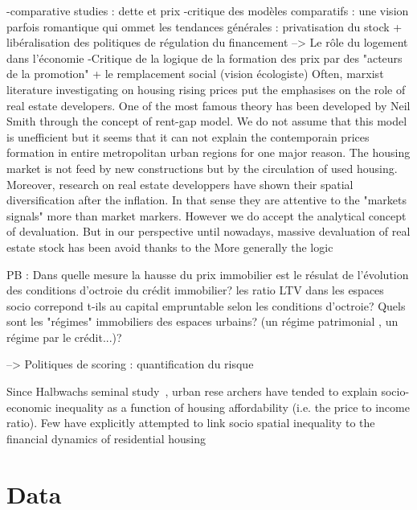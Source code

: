 -comparative studies : dette et prix
-critique des modèles comparatifs : une vision parfois romantique qui ommet les tendances générales : privatisation du stock + libéralisation des politiques de régulation du financement
--> Le rôle du logement dans l'économie
-Critique de la logique de la formation des prix par des "acteurs de la promotion" + le remplacement social (vision écologiste)
Often, marxist literature investigating on housing rising prices put the emphasises on the role of real estate developers. One of the most famous theory has been developed by Neil Smith through the concept of rent-gap model. We do not assume that this model is unefficient but it seems that it can not explain the contemporain prices formation in entire metropolitan urban regions for one major reason. The housing market is not feed by new constructions but by the circulation of used housing. Moreover, research on real estate developpers have shown their spatial diversification after the inflation. In that sense they are attentive to the "markets signals" more than market markers. However we do accept the analytical concept of devaluation. But in our perspective until nowadays, massive devaluation of real estate stock has been avoid thanks to the  More generally the logic 

PB : Dans quelle mesure la hausse du prix immobilier est le résulat de l'évolution des conditions d'octroie du crédit immobilier? 
les ratio LTV dans les espaces socio correpond t-ils au capital empruntable selon les conditions d'octroie? Quels sont les "régimes" immobiliers des espaces urbains? (un régime patrimonial , un régime par le crédit...)?

--> Politiques de scoring : quantification du risque

Since Halbwachs seminal study~\cite{halbwachs1913classe}, urban rese
archers have tended to explain socio-economic inequality as  a  function  of  housing  affordability  (i.e.  the  price to
income  ratio).  Few  have  explicitly  attempted  to  link socio spatial  inequality  to  the  financial  dynamics  of  residential  housing




\section{Data}


